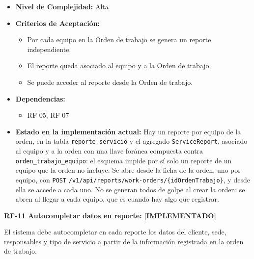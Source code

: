\documentclass[12pt,a4paper]{article}
\newcommand{\ruta}[1]{\nolinkurl{#1}}
\newcommand{\estadoImplementado}{\textcolor{mainRed}{\textbf{[IMPLEMENTADO]}}}
\begin{document}
\begin{itemize}
  \item \textbf{Nivel de Complejidad:} Alta

  \item \textbf{Criterios de Aceptación:}
  \begin{itemize}
    \item Por cada equipo en la Orden de trabajo se genera un reporte independiente.
    \item El reporte queda asociado al equipo y a la Orden de trabajo.
    \item Se puede acceder al reporte desde la Orden de trabajo.
  \end{itemize}

  \item \textbf{Dependencias:}
  \begin{itemize}
    \item RF-05, RF-07
  \end{itemize}

  \item \textbf{Estado en la implementación actual:} Hay un reporte por equipo de la orden, en la tabla \texttt{reporte\_servicio} y el agregado \texttt{ServiceReport}, asociado al equipo y a la orden con una llave foránea compuesta contra \texttt{orden\_trabajo\_equipo}: el esquema impide por sí solo un reporte de un equipo que la orden no incluye. Se abre desde la ficha de la orden, uno por equipo, con \texttt{POST} \ruta{/v1/api/reports/work-orders/{idOrdenTrabajo}}, y desde ella se accede a cada uno. No se generan todos de golpe al crear la orden: se abren al llegar a cada equipo, que es cuando hay algo que registrar.
\end{itemize}

\textbf{RF-11 Autocompletar datos en reporte:} \estadoImplementado{}

El sistema debe autocompletar en cada reporte los datos del cliente, sede, responsables y tipo de servicio a partir de la información registrada en la orden de trabajo.
\end{document}

